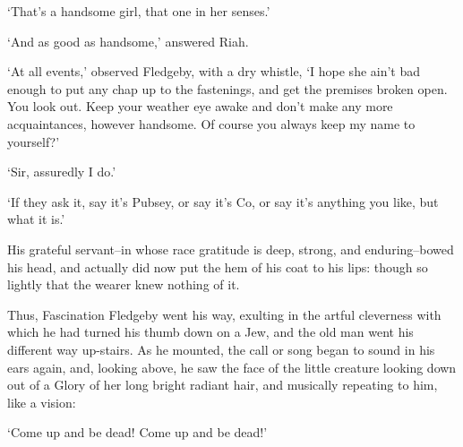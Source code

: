 ‘That’s a handsome girl, that one in her senses.’

‘And as good as handsome,’ answered Riah.

‘At all events,’ observed Fledgeby, with a dry whistle, ‘I hope she
ain’t bad enough to put any chap up to the fastenings, and get the
premises broken open. You look out. Keep your weather eye awake and
don’t make any more acquaintances, however handsome. Of course you
always keep my name to yourself?’

‘Sir, assuredly I do.’

‘If they ask it, say it’s Pubsey, or say it’s Co, or say it’s anything
you like, but what it is.’

His grateful servant--in whose race gratitude is deep, strong, and
enduring--bowed his head, and actually did now put the hem of his coat
to his lips: though so lightly that the wearer knew nothing of it.

Thus, Fascination Fledgeby went his way, exulting in the artful
cleverness with which he had turned his thumb down on a Jew, and the old
man went his different way up-stairs. As he mounted, the call or song
began to sound in his ears again, and, looking above, he saw the face
of the little creature looking down out of a Glory of her long bright
radiant hair, and musically repeating to him, like a vision:

‘Come up and be dead! Come up and be dead!’



